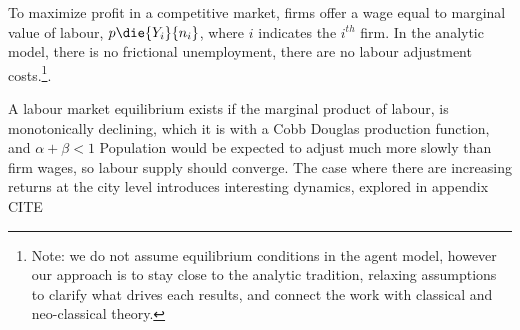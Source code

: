 
To maximize profit 
in a competitive market, firms offer a wage equal to marginal value of labour, $p\die{Y_i}{n_i}$, where $i$ indicates the $i^{th}$ firm. In the analytic model, there is no frictional unemployment, there are no labour adjustment costs.\footnote{Note: we do not assume equilibrium conditions in the agent model, however our approach is to stay close to the analytic tradition, relaxing assumptions to clarify what drives each results, and connect the work with classical and neo-classical theory.}. %

A labour market equilibrium exists if the marginal product of labour, is monotonically declining, which it is with a Cobb Douglas production function, and $\alpha + \beta<1$ 
Population would be expected to adjust much more slowly than firm wages, so labour supply should converge. The case where there are increasing returns at the city level introduces interesting dynamics, explored in appendix CITE %

